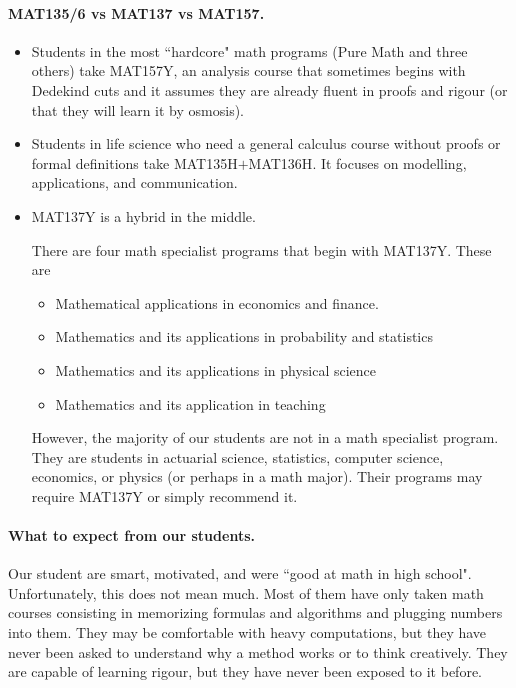 \documentclass[11pt]{article}
\begin{document}
\paragraph{MAT135/6 vs MAT137 vs MAT157.} 
\begin{itemize}
\item Students in the most ``hardcore" math programs (Pure Math and three others) take \textcolor{137cp1}{MAT157Y}, an analysis course that sometimes begins with Dedekind cuts and it assumes they are already fluent in proofs and rigour (or that they will learn it by osmosis).

\item Students in life science who need a general calculus course without proofs or formal definitions take \textcolor{137cp1}{MAT135H$+$MAT136H}.  It focuses on modelling, applications, and communication.

\item \textcolor{137cp1}{MAT137Y} is a hybrid in the middle.  

There are four math specialist programs that begin with MAT137Y.   These are
			\begin{itemize}
				\item Mathematical applications in economics and finance.
				\item Mathematics and its applications in probability and statistics
				\item  Mathematics and its applications in physical science
				\item Mathematics and its application in teaching
			\end{itemize}
However, the majority of our students are not in a math specialist program.  They are students in actuarial science, statistics, computer science, economics, or physics (or perhaps in a math major).  Their programs may require MAT137Y or simply recommend it.
\end{itemize}

\paragraph{What to expect from our students.}  Our student are smart, motivated, and were ``good at math in high school".  Unfortunately, this does not mean much. Most of them have only taken math courses consisting in memorizing formulas and algorithms and plugging numbers into them.  They may be comfortable with heavy computations, but they have never been asked to understand why a method works or to think creatively.  They are capable of learning rigour, but they have never been exposed to it before.
\end{document}
